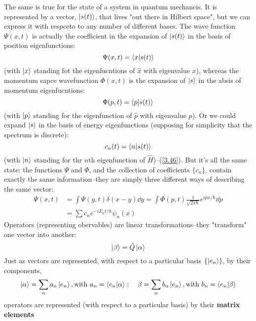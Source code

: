 The same is true for the state of a system in quantum mechancis. It is represented by a vector, $\ket{s(t)}$, that lives "out there in Hilbert space", but we can express it with respceto to any number of different bases. The wave function $\Psi(x,t)$ is actually the coefficient in the expansion of $\ket{s(t)}$ in the basis of position eigenfunctions:
\begin{equation}\label{3.75}
	\Psi(x,t)=\braket{x}{s(t)}
\end{equation}
(with $\ket{x}$ standing fot the eigenfucntions of $\hat{x}$ with eigenvalue $x$), whereas the momentum sapce wavefunction $\Phi(x,t)$ is the expansion of $\ket{s}$ in the absis of momentum eigenfucntions:
\begin{equation}\label{3.76}
	\Phi(p,t)=\braket{p}{s(t)}
\end{equation}
(with $\ket{p}$ standing for the eigenfunction of $\hat{p}$ with eigenvalue $p$). Or we could expand $\ket{s}$ in the basis of energy eigenfunctions (supposing for simplicity that the spectrum is discrete):
\begin{equation}\label{3.77}
	c_n(t)=\braket{n}{s(t)}
\end{equation}
(with $\ket{n}$ standing for thr $n$th eigenfunction of $\hat{H}$)--(\ref{3.46}). But it's all the same state; the functions $\Psi$ and $\Phi$, and the collection of coefficients $\{c_n\}$, contain exactly the same information--they are simply three different ways of describing the same vector:
\begin{align}
	\nonumber \Psi(x,t)&=\int\Psi(y,t)\delta(x-y)\dd y=\int\Phi(p,t)\frac{1}{\sqrt{2\pi\hbar}}e^{ipx/\hbar}\dd  p\\
										 &=\sum c_ne^{-iE_nt/\hbar}\psi_n(x)\label{3.78}
\end{align}
Operators (representing obervables) are linear transformations--they "transform" one vector into another:
\begin{equation}\label{3.79}
	\ket{\beta}=\hat{Q}\ket{\alpha}
\end{equation}
Just as vectors are represented, with respect to a particular basis $\{\ket{e_n}\}$, by their components,
\begin{equation}\label{3.80}
	\ket{\alpha}=\sum_n a_n\ket{e_n}, \mbox{with } a_n=\braket{e_n}{\alpha}:\quad \beta=\sum_n b_n\ket{e_n}, \mbox{with } b_n=\braket{e_n}{\beta}
\end{equation}
operators are represented (with respect to a particular basis) by their \textbf{matrix elements}
